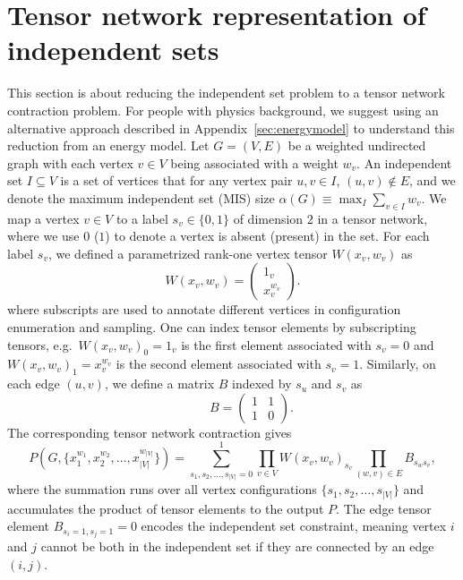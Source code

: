 \documentclass[onefignum, onetabnum]{siamart190516}
\newcommand{\<}{\langle}
\renewcommand{\>}{\rangle}
\newcommand{\App}[1]{Appendix~\ref{#1}}
\begin{document}
\section{Tensor network representation of independent sets} \label{sec:tnmap}
This section is about reducing the independent set problem to a tensor network contraction problem.
For people with physics background, we suggest using an alternative approach described in \App{sec:energymodel} to understand this reduction from an energy model.
Let $G=(V,E)$ be a weighted undirected graph with each vertex $v\in V$ being associated with a weight $w_v$.
An independent set $I \subseteq V$ is a set of vertices that for any vertex pair $u,v \in I$, $(u, v) \not\in E$,
and we denote the maximum independent set (MIS) size $\alpha(G) \equiv \max_{I}\sum_{v\in I}w_v$. 
We map a vertex $v\in V$ to a label $s_v \in \{0, 1\}$ of dimension $2$ in a tensor network, where we use $0$ ($1$) to denote a vertex is absent (present) in the set.
For each label $s_v$, we defined a parametrized rank-one vertex tensor $W(x_v, w_v)$ as
\begin{equation}
    W(x_v, w_v) = \left(\begin{matrix}
        1_v \\
        x_v^{w_v}
    \end{matrix}\right).\label{eq:vertextensor}
\end{equation}
where subscripts are used to annotate different vertices in configuration enumeration and sampling.
One can index tensor elements by subscripting tensors, e.g.\ $W(x_v, w_v)_0=1_v$ is the first element associated with $s_v=0$ and $W(x_v, w_v)_1=x_v^{w_v}$ is the second element associated with $s_v=1$.
Similarly, on each edge $(u, v)$, we define a matrix $B$ indexed by $s_u$ and $s_v$ as
\begin{equation}
    \qquad \quad 
       B = \left(\begin{matrix}
        1  & 1\\
        1 & 0
    \end{matrix}\right). \label{eq:edgetensor}
\end{equation}
The corresponding tensor network contraction gives
\begin{equation}\label{eq:idp}
    P(G, \{x_1^{w_1}, x_{2}^{w_2}, \ldots,x_{|V|}^{w_{|V|}}\}) = \sum\limits_{s_1, s_2, \ldots, s_{|V|} = 0}^{1} \prod\limits_{v\in V} W(x_v, w_v)_{s_v} \prod\limits_{(w,v) \in E} B_{s_w s_v},
\end{equation}
where the summation runs over all vertex configurations $\{s_1, s_{2}, \ldots,s_{|V|}\}$ and accumulates the product of tensor elements to the output $P$.
The edge tensor element $B_{s_{i}=1, s_{j}=1} = 0$ encodes the independent set constraint, meaning vertex $i$ and $j$ cannot be both in the independent set if they are connected by an edge $(i,j)$.
\end{document}

